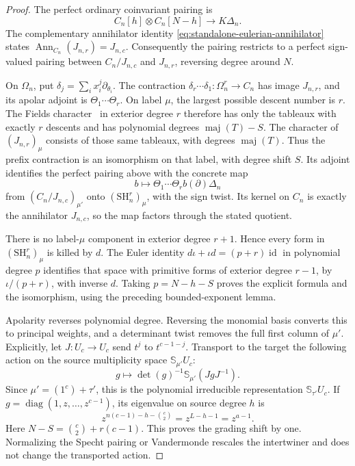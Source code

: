 \begin{proof}
The perfect ordinary coinvariant pairing is
\[
 C_n[h]\otimes C_n[N-h]\longrightarrow K\Delta_n.
\]
The complementary annihilator identity
\eqref{eq:standalone-eulerian-annihilator} states
$\operatorname{Ann}_{C_n}(J_{n,r})=J_{n,c}$.
Consequently the pairing restricts to a perfect sign-valued pairing
between $C_n/J_{n,c}$ and $J_{n,r}$, reversing degree around $N$.

On $\Omega_n$, put $\delta_j=\sum_i x_i^j\partial_{\theta_i}$.
The contraction $\delta_r\cdots\delta_1:\Omega_n^r\to C_n$ has
image $J_{n,r}$, and its apolar adjoint is
$\Theta_1\cdots\Theta_r$. On label $\mu$, the largest possible
descent number is $r$. The Fields character~\cite[Theorem~5.2]{MRW} in exterior degree $r$
therefore has only the tableaux with exactly $r$ descents and has
polynomial degrees $\operatorname{maj}(T)-S$.
The character of $(J_{n,r})_\mu$ consists of those same tableaux,
with degrees $\operatorname{maj}(T)$. Thus the prefix contraction
is an isomorphism on that label, with degree shift $S$.
Its adjoint identifies the perfect pairing above with the concrete map
\[
 b\longmapsto \Theta_1\cdots\Theta_r b(\partial)\Delta_n
\]
from $(C_n/J_{n,c})_{\mu'}$ onto $(\mathrm{SH}_n^r)_\mu$, with
the sign twist. Its kernel on $C_n$ is exactly the annihilator
$J_{n,c}$, so the map factors through the stated quotient.

There is no label-$\mu$ component in exterior degree $r+1$.
Hence every form in $(\mathrm{SH}_n^r)_\mu$ is killed by $d$.
The Euler identity $d\iota+\iota d=(p+r)\operatorname{id}$ in
polynomial degree $p$ identifies that space with primitive forms of
exterior degree $r-1$, by $\iota/(p+r)$, with inverse $d$.
Taking $p=N-h-S$ proves the explicit formula and the isomorphism,
using the preceding bounded-exponent lemma.

Apolarity reverses polynomial degree. Reversing the monomial basis
converts this to principal weights, and a determinant twist removes
the full first column of $\mu'$. Explicitly, let
$J:U_c\to U_c$ send $t^j$ to $t^{c-1-j}$.
Transport to the target the following action on the source multiplicity
space $\mathbb S_{\mu'}U_c$:
\[
       g\longmapsto \det(g)^{-1}\mathbb S_{\mu'}(JgJ^{-1}).
\]
Since $\mu'=(1^c)+\tau'$, this is the polynomial irreducible
representation $\mathbb S_{\tau'}U_c$. If
$g=\operatorname{diag}(1,z,\ldots,z^{c-1})$, its eigenvalue on source
degree $h$ is
\[
 z^{n(c-1)-h-\binom c2}=z^{L-h-1}=z^{a-1}.
\]
Here $N-S=\binom c2+r(c-1)$.
This proves the grading shift by one. Normalizing the Specht pairing
or Vandermonde rescales the intertwiner and does not change the
transported action.
\end{proof}

